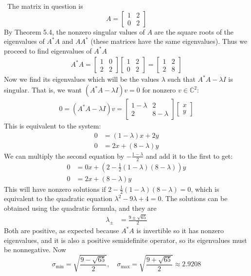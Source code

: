 \documentclass[12pt]{article}
\newenvironment{sol}[1][Solution]{\begin{trivlist}
		\item[\hskip \labelsep {\bfseries #1:}]}{\end{trivlist}}
\begin{document}
\begin{sol}
	\
	The matrix in question is
	\[
	A = \begin{bmatrix}
		1 & 2\\
		0 & 2
	\end{bmatrix}
	\]
	By Theorem 5.4, the nonzero singular values of $A$ are the square roots of the eigenvalues of $A^*A$ and $AA^*$
	(these matrices have the same eigenvalues). Thus we proceed to find eigenvalues of $A^*A$
	\begin{align*}
		A^*A = 
		\begin{bmatrix}
			1 & 0\\
			2 & 2
		\end{bmatrix}
		\begin{bmatrix}
			1 & 2\\
			0 & 2
		\end{bmatrix}
		=\begin{bmatrix}
			1 & 2\\
			2 & 8
		\end{bmatrix}
	\end{align*}
	Now we find its eigenvalues which will be the values $\lambda$ such that $A^*A-\lambda I$ is singular.
	That is, we want $(A^*A-\lambda I)v=0$ for nonzero $v\in\mathbb{C}^2$:
	\begin{align*}
		0=(A^*A-\lambda I)v=\begin{bmatrix}
			1-\lambda & 2\\
			2 & 8-\lambda
		\end{bmatrix}
		\begin{bmatrix}
			x\\
			y
		\end{bmatrix}
	\end{align*}
	This is equivalent to the system:
	\begin{align*}
		0 &= (1-\lambda)x + 2y\\
		0 &= 2x + (8-\lambda)y
	\end{align*}
	We can multiply the second equation by $-\frac{1-\lambda}{2}$ and add it to the first to get:
	\begin{align*}
		0 &= 0x +\left(2-\frac{1}{2}(1-\lambda)(8-\lambda)\right)y\\
		0 &= 2x + (8-\lambda)y
	\end{align*}
	This will have nonzero solutions if $2-\frac{1}{2}(1-\lambda)(8-\lambda)=0$, which is equivalent
	to the quadratic equation $\lambda^2-9\lambda+4=0$. The solutions can be obtained using the quadratic
	formula, and they are
	\begin{align*}
		\lambda_{\pm} &= \frac{9\pm \sqrt{65}}{2}
	\end{align*}
	Both are positive, as expected because $A^*A$ is invertible so it has nonzero eigenvalues, and it is
	also a positive semidefinite operator, so its eigenvalues must be nonnegative. Now
	\[
	\sigma_{\text{min}} = \sqrt{\frac{9-\sqrt{65}}{2}},\quad \sigma_{\text{max}}=\sqrt{\frac{9+\sqrt{65}}{2}}
	\approx 2.9208
	\]
\end{sol}
\end{document}
